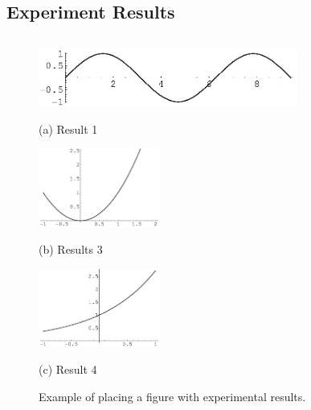\subsection{Experiment Results}

\begin{tabular}{c}

\end{tabular}
\begin{figure}[htb]

\begin{minipage}[b]{1.0\linewidth}
  \centering
  \centerline{\includegraphics[width=8.5cm]{images/image1}}
  \centerline{(a) Result 1}\medskip
\end{minipage}
%
\begin{minipage}[b]{.48\linewidth}
  \centering
  \centerline{\includegraphics[width=4.0cm]{images/image3}}
  \centerline{(b) Results 3}\medskip
\end{minipage}
\hfill
\begin{minipage}[b]{0.48\linewidth}
  \centering
  \centerline{\includegraphics[width=4.0cm]{images/image4}}
  \centerline{(c) Result 4}\medskip
\end{minipage}
%
\caption{Example of placing a figure with experimental results.}
\label{fig:res}
%
\end{figure}



